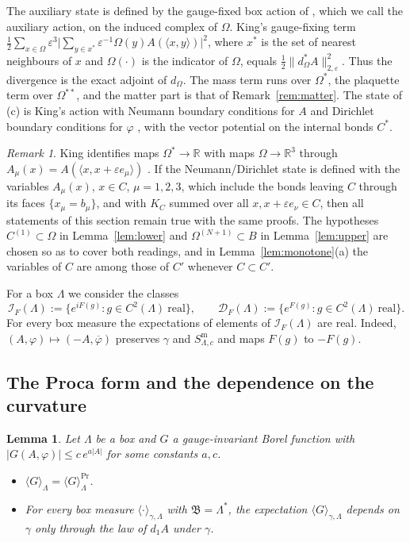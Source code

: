 \documentclass[11pt]{amsart}
\theoremstyle{plain}
\newtheorem{lemma}[theorem]{Lemma}
\theoremstyle{definition}
\theoremstyle{remark}
\newtheorem{remark}[theorem]{Remark}
\numberwithin{equation}{section}
\newcommand{\R}{\mathbb{R}}
\newcommand{\eps}{\varepsilon}
\newcommand{\cD}{\mathcal{D}}
\newcommand{\cI}{\mathcal{I}}
\newcommand{\fB}{\mathfrak{B}}
\newcommand{\abs}[1]{\lvert #1\rvert}
\newcommand{\norm}[1]{\lVert #1\rVert}
\newcommand{\ev}[1]{\langle #1\rangle}
\begin{document}
The auxiliary state is defined by the gauge-fixed box action of \cite[(3.38), p.~335]{K2}, which we call the auxiliary action, on the induced complex of $\Omega$. King's gauge-fixing term $\frac12\sum_{x\in\Omega}\eps^3\abs{\sum_{y\in x^*}\eps^{-1}\Omega(y)A(\ev{x,y})}^2$, where $x^*$ is the set of nearest neighbours of $x$ and $\Omega(\cdot)$ is the indicator of $\Omega$, equals $\frac12\norm{d^*_\Omega A}_{2,\eps}^2$. Thus the divergence is the exact adjoint of $d_\Omega$. The mass term runs over $\Omega^*$, the plaquette term over $\Omega^{**}$, and the matter part is that of Remark~\ref{rem:matter}. The state of (c) is King's action \cite[(2.5), p.~324]{K2} with Neumann boundary conditions for $A$ and Dirichlet boundary conditions for $\varphi$ \cite[(2.9)--(2.10), p.~325]{K2}, with the vector potential on the internal bonds $C^*$.

\begin{remark}\label{rem:reading}
King identifies maps $\Omega^*\to\R$ with maps $\Omega\to\R^3$ through $A_\mu(x)=A(\ev{x,x+\eps e_\mu})$ \cite[(2.2)]{K2}. If the Neumann/Dirichlet state is defined with the variables $A_\mu(x)$, $x\in C$, $\mu=1,2,3$, which include the bonds leaving $C$ through its faces $\{x_\mu=b_\mu\}$, and with $K_C$ summed over all $x,x+\eps e_\nu\in C$, then all statements of this section remain true with the same proofs. The hypotheses $C^{(1)}\subset\Omega$ in Lemma~\ref{lem:lower} and $\Omega^{(N+1)}\subset B$ in Lemma~\ref{lem:upper} are chosen so as to cover both readings, and in Lemma~\ref{lem:monotone}(a) the variables of $C$ are among those of $C'$ whenever $C\subset C'$.
\end{remark}

For a box $\Lambda$ we consider the classes
\[
\cI_F(\Lambda):=\{e^{iF(g)}:g\in C^2(\Lambda)\ \text{real}\},\qquad\cD_F(\Lambda):=\{e^{F(g)}:g\in C^2(\Lambda)\ \text{real}\}.
\]
For every box measure the expectations of elements of $\cI_F(\Lambda)$ are real. Indeed, $(A,\varphi)\mapsto(-A,\overline\varphi)$ preserves $\gamma$ and $S^{\mathrm m}_{\Lambda,c}$ and maps $F(g)$ to $-F(g)$.

\subsection{The Proca form and the dependence on the curvature}

\begin{lemma}\label{lem:Proca}
Let $\Lambda$ be a box and $G$ a gauge-invariant Borel function with $\abs{G(A,\varphi)}\le c\,e^{a\abs A}$ for some constants $a,c$.
\begin{itemize}
\item[(a)] $\ev G_\Lambda=\ev G^{\mathrm{Pr}}_\Lambda$.
\item[(b)] For every box measure $\ev\cdot_{\gamma,\Lambda}$ with $\fB=\Lambda^*$, the expectation $\ev G_{\gamma,\Lambda}$ depends on $\gamma$ only through the law of $d_1A$ under $\gamma$.
\end{itemize}
\end{lemma}
\end{document}
